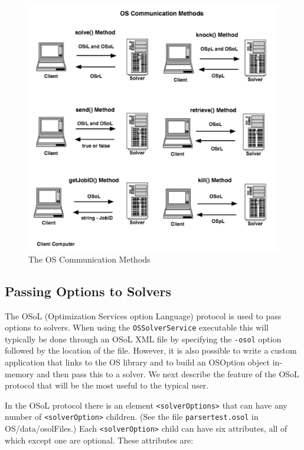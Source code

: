 \documentclass[11pt]{article}
\newcommand{\figurepath}{./figures}
\renewcommand{\_}{{\char"5F}}
\renewcommand{\{}{{\char"7B}}
\renewcommand{\}}{{\char"7D}}
\renewcommand{\^}{{\char"0D}}
\renewcommand{\'}{{\char"0D}}
\begin{document}
\begin{enumerate}[Step 1:]
\begin{figure}[ht]
\centering
\includegraphics[scale=0.5]{./figures/osCommunicationMethods.pdf}
\caption{The OS Communication Methods}
\label{figure:osCommunicationMethods}
\end{figure}


\subsection{Passing Options to Solvers}

The OSoL (Optimization Services option Language) protocol is used to pass options to solvers.   
When using the {\tt OSSolverService} executable this will typically be done through an OSoL XML file 
by specifying the {\tt -osol} option followed by the location of the file.  However, it is also possible 
to write a custom application that links to the OS library and to build an OSOption object in-memory 
and then pass this to a solver. We next describe the  feature of the OSoL protocol that will be the most 
useful to the typical user.

In the OSoL protocol there is an element {\tt <solverOptions>} that can have any number of {\tt <solverOption>} 
children. (See the file {\tt parsertest.osol} in OS/data/osolFiles.)  Each {\tt <solverOption>} child can have 
six attributes, all of which except one are optional. These attributes are:


\end{enumerate}
\end{document}
